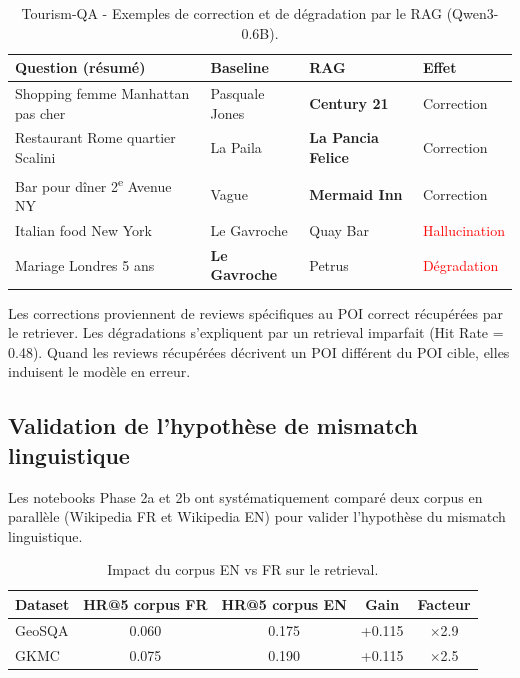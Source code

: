 \documentclass[12pt,a4paper]{article}
\begin{document}
\begin{table}[H]
\centering
\caption{Tourism-QA - Exemples de correction et de d\'egradation par le RAG (Qwen3-0.6B).}
\label{tab:exemples_tourismqa}
\small
\footnotesize
\begin{tabular}{@{} p{4.2cm} p{2.6cm} p{2.6cm} p{2.0cm} @{}}
\toprule
\textbf{Question (r\'esum\'e)} & \textbf{Baseline} & \textbf{RAG} & \textbf{Effet} \\
\midrule
Shopping femme Manhattan pas cher & Pasquale Jones & \textbf{Century 21}
  & \textcolor{green!60!black}{Correction} \\
Restaurant Rome quartier Scalini  & La Paila & \textbf{La Pancia Felice}
  & \textcolor{green!60!black}{Correction} \\
Bar pour d\^iner 2\textsuperscript{e} Avenue NY & Vague & \textbf{Mermaid Inn}
  & \textcolor{green!60!black}{Correction} \\
\midrule
Italian food New York & Le Gavroche & Quay Bar
  & \textcolor{red}{Hallucination} \\
Mariage Londres 5 ans & \textbf{Le Gavroche} & Petrus
  & \textcolor{red}{D\'egradation} \\
\bottomrule
\end{tabular}
\end{table}

Les corrections proviennent de reviews sp\'ecifiques au POI correct r\'ecup\'er\'ees par le retriever. Les d\'egradations s'expliquent par un retrieval imparfait (Hit Rate = 0.48). Quand les reviews r\'ecup\'er\'ees d\'ecrivent un POI diff\'erent du POI cible, elles induisent le mod\`ele en erreur.

\subsection{Validation de l'hypoth\`ese de mismatch linguistique}
\label{sec:validation_en}

Les notebooks Phase 2a et 2b ont syst\'ematiquement compar\'e deux corpus en parall\`ele (Wikipedia FR et Wikipedia EN) pour valider l'hypoth\`ese du mismatch linguistique.

\begin{table}[H]
\centering
\caption{Impact du corpus EN vs FR sur le retrieval.}
\label{tab:en_vs_fr}
\begin{tabular}{@{} l c c c c @{}}
\toprule
\textbf{Dataset} & \textbf{HR@5 corpus FR} & \textbf{HR@5 corpus EN}
  & \textbf{Gain} & \textbf{Facteur} \\
\midrule
GeoSQA & 0.060 & 0.175 & +0.115 & $\times$2.9 \\
\rowcolor{lightgray}
GKMC   & 0.075 & 0.190 & +0.115 & $\times$2.5 \\
\bottomrule
\end{tabular}
\end{table}
\end{document}
